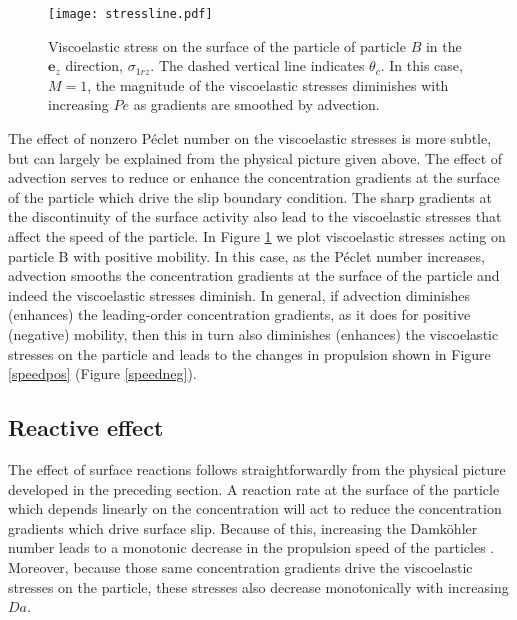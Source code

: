 \documentclass[aps,pre,reprint,twocolumn,notitlepage,superscriptaddress]{revtex4-1}
\begin{document}
\begin{figure}[t!]
\centering
        \texttt{[image: stressline.pdf]}
        \caption{Viscoelastic stress on the surface of the particle of particle $B$ in the $\boldsymbol{e}_z$ direction, $\sigma_{1rz}$. The dashed vertical line indicates $\theta_c$. In this case, $M=1$, the magnitude of the viscoelastic stresses diminishes with increasing $Pe$ as gradients are smoothed by advection.}
		\label{stressfig}
\end{figure}

The effect of nonzero P\'eclet number on the viscoelastic stresses is more subtle, but can largely be explained from the physical picture given above. The effect of advection serves to reduce or enhance the concentration gradients at the surface of the particle which drive the slip boundary condition. The sharp gradients at the discontinuity of the surface activity also lead to the viscoelastic stresses that affect the speed of the particle. In Figure \ref{stressfig} we plot viscoelastic stresses acting on particle B with positive mobility. In this case, as the P\'eclet number increases, advection smooths the concentration gradients at the surface of the particle and indeed the viscoelastic stresses diminish. In general, if advection diminishes (enhances) the leading-order concentration gradients, as it does for positive (negative) mobility, then this in turn also diminishes (enhances) the viscoelastic stresses on the particle and leads to the changes in propulsion shown in Figure \ref{speedpos} (Figure \ref{speedneg}).




\subsection{Reactive effect}
The effect of surface reactions follows straightforwardly from the physical picture developed in the preceding section. A reaction rate at the surface of the particle which depends linearly on the concentration will act to reduce the concentration gradients which drive surface slip. Because of this, increasing the Damk\"ohler number leads to a monotonic decrease in the propulsion speed of the particles \cite{michelin14}. Moreover, because those same concentration gradients drive the viscoelastic stresses on the particle, these stresses also decrease monotonically with increasing $Da$.
\end{document}
